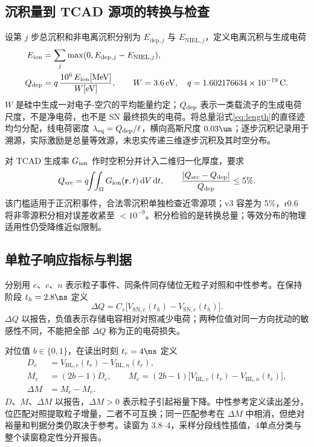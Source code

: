 \subsection{沉积量到 TCAD 源项的转换与检查}

设第 $j$ 步总沉积和非电离沉积分别为 $E_{\mathrm{dep},j}$ 与 $E_{\mathrm{NIEL},j}$，定义电离沉积与生成电荷
\begin{align}
E_{\rm ion}&=\sum_j\max(0,E_{\mathrm{dep},j}-E_{\mathrm{NIEL},j}),\\
Q_{\rm dep}&=q\,\frac{10^6\,E_{\rm ion}[\mathrm{MeV}]}{W[\mathrm{eV}]},\qquad
W=3.6\,\mathrm{eV},\quad q=1.602176634\times10^{-19}\,\mathrm{C}.
\label{eq:qdep}
\end{align}
$W$ 是硅中生成一对电子-空穴的平均能量约定\cite{ryder2021}；$Q_{\rm dep}$ 表示一类载流子的生成电荷尺度，不是净电荷，也不是 SN 最终损失的电荷。将总量沿式\eqref{eq:length}的直径迹均匀分配，线电荷密度 $\lambda_{\rm eq}=Q_{\rm dep}/\ell$，横向高斯尺度 $0.03\um$；逐步沉积记录用于溯源，实际激励是总量等效源，未忠实传递三维逐步沉积及其时空分布。

对 TCAD 生成率 $G_{\rm ion}$ 作时空积分并计入二维归一化厚度，要求
\begin{equation}
Q_{\rm src}=q\!\!\int\!\!\int_{\Omega}G_{\rm ion}(\mathbf r,t)\,\mathrm dV\,\mathrm dt,
\qquad \frac{|Q_{\rm src}-Q_{\rm dep}|}{Q_{\rm dep}}\leq 5\%.
\label{eq:source}
\end{equation}
该门槛适用于正沉积事件，合法零沉积单独检查近零源项；v3 容差为 5\%，r0.6 将非零源积分相对误差收紧至 $<10^{-9}$。积分检验的是转换总量；等效分布的物理适用性仍受降维近似限制。

\subsection{单粒子响应指标与判据}

分别用 $e$、$c$、$n$ 表示粒子事件、同条件同存储位无粒子对照和中性参考。在保持阶段 $t_h=2.8\ns$ 定义
\begin{equation}
\Delta Q=C_s\big[V_{\mathrm{SN},e}(t_h)-V_{\mathrm{SN},c}(t_h)\big].
\label{eq:dq}
\end{equation}
$\Delta Q$ 以\fC 报告，负值表示存储电容相对对照减少电荷；两种位值对同一方向扰动的敏感性不同，不能把全部 $\Delta Q$ 称为正的电荷损失。

对位值 $b\in\{0,1\}$，在读出时刻 $t_r=4\ns$ 定义
\begin{align}
D_e&=V_{\mathrm{BL},e}(t_r)-V_{\mathrm{BL},n}(t_r),\\
M_e&=(2b-1)D_e,\qquad
M_c=(2b-1)\big[V_{\mathrm{BL},c}(t_r)-V_{\mathrm{BL},n}(t_r)\big],\\
\Delta M&=M_c-M_e.
\label{eq:margin}
\end{align}
$D$、$M$、$\Delta M$ 以\mV 报告，$\Delta M>0$ 表示粒子引起裕量下降。中性参考定义读出差分，位匹配对照提取粒子增量，二者不可互换；同一匹配参考在 $\Delta M$ 中相消，但绝对裕量和判据分类仍取决于参考。读窗为 3.8--4\ns，采样分段线性插值，4\ns 单点分类与整个读窗稳定性分开报告。

